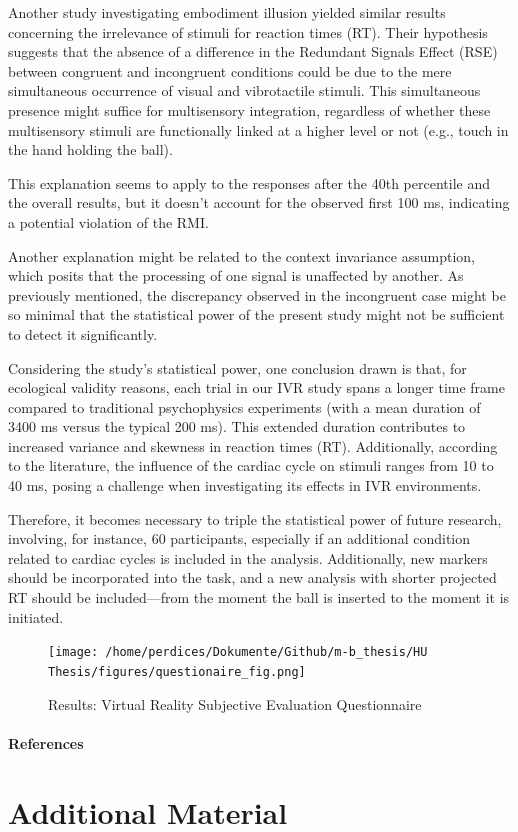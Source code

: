 \documentclass[12pt,oneside,openright]{report}
\begin{document}
Another study investigating embodiment illusion yielded similar results concerning the irrelevance of stimuli for reaction times (RT). Their hypothesis suggests that the absence of a difference in the Redundant Signals Effect (RSE) between congruent and incongruent conditions could be due to the mere simultaneous occurrence of visual and vibrotactile stimuli. This simultaneous presence might suffice for multisensory integration, regardless of whether these multisensory stimuli are functionally linked at a higher level or not (e.g., touch in the hand holding the ball)\parencite{RSE_FBI}.

This explanation seems to apply to the responses after the 40th percentile and the overall results, but it doesn't account for the observed first 100 ms, indicating a potential violation of the RMI.

Another explanation might be related to the context invariance assumption, which posits that the processing of one signal is unaffected by another. As previously mentioned, the discrepancy observed in the incongruent case might be so minimal that the statistical power of the present study might not be sufficient to detect it significantly.

Considering the study's statistical power, one conclusion drawn is that, for ecological validity reasons, each trial in our IVR study spans a longer time frame compared to traditional psychophysics experiments (with a mean duration of 3400 ms versus the typical 200 ms). This extended duration contributes to increased variance and skewness in reaction times (RT). Additionally, according to the literature, the influence of the cardiac cycle on stimuli ranges from 10 to 40 ms, posing a challenge when investigating its effects in IVR environments.

Therefore, it becomes necessary to triple the statistical power of future research, involving, for instance, 60 participants, especially if an additional condition related to cardiac cycles is included in the analysis. Additionally, new markers should be incorporated into the task, and a new analysis with shorter projected RT should be included—from the moment the ball is inserted to the moment it is initiated.  


\newpage
\begin{figure}[ht]
        \centering
        \texttt{[image: /home/perdices/Dokumente/Github/m-b\_thesis/HU Thesis/figures/questionaire\_fig.png]}
        \caption{Results: Virtual Reality Subjective Evaluation Questionnaire}
        \label{fig:quest}
\end{figure}
\pagebreak



\paragraph{\textbf{References}}
\printbibliography[heading=none]


\pagebreak
\vspace*{\fill}
\section*{\centering Additional Material}
\vspace*{\fill}
\end{document}
